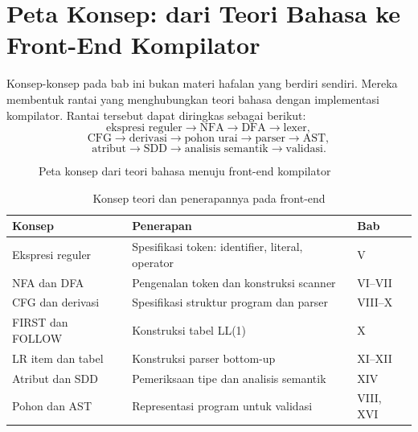 \section{Peta Konsep: dari Teori Bahasa ke Front-End Kompilator}
\label{sec:ch02-peta}

Konsep-konsep pada bab ini bukan materi hafalan yang berdiri sendiri.
Mereka membentuk rantai yang menghubungkan teori bahasa dengan
implementasi kompilator. Rantai tersebut dapat diringkas sebagai
berikut:
\[
\text{ekspresi reguler} \to \text{NFA} \to \text{DFA} \to
\text{lexer},
\]
\[
\text{CFG} \to \text{derivasi} \to \text{pohon urai} \to
\text{parser} \to \text{AST},
\]
\[
\text{atribut} \to \text{SDD} \to \text{analisis semantik} \to
\text{validasi}.
\]

\begin{figure}[H]
\centering
{}
\caption{Peta konsep dari teori bahasa menuju front-end kompilator}
\label{fig:ch02-peta-konsep}
\end{figure}

\begin{table}[H]
\centering
\caption{Konsep teori dan penerapannya pada front-end}
\label{tab:ch02-peta}
\begin{tabularx}{\textwidth}{@{}l X l@{}}
\toprule
\textbf{Konsep} & \textbf{Penerapan} & \textbf{Bab} \\
\midrule
Ekspresi reguler & Spesifikasi token: identifier, literal, operator &
V \\
NFA dan DFA & Pengenalan token dan konstruksi scanner & VI--VII \\
CFG dan derivasi & Spesifikasi struktur program dan parser & VIII--X \\
FIRST dan FOLLOW & Konstruksi tabel LL(1) & X \\
LR item dan tabel & Konstruksi parser bottom-up & XI--XII \\
Atribut dan SDD & Pemeriksaan tipe dan analisis semantik & XIV \\
Pohon dan AST & Representasi program untuk validasi & VIII, XVI \\
\bottomrule
\end{tabularx}
\end{table}

